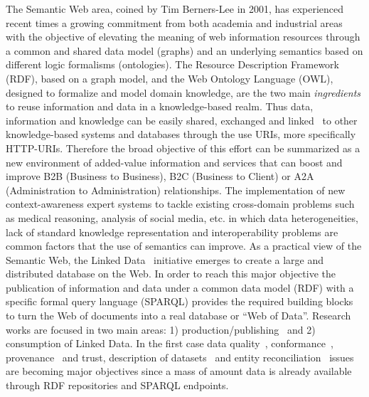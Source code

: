 The Semantic Web area, coined by Tim Berners-Lee in 2001, has experienced recent times a growing 
commitment from both academia and industrial areas  with the objective of elevating the meaning of web 
information resources through a common and shared data model (graphs) and an underlying semantics based 
on different logic formalisms (ontologies). The Resource Description Framework (RDF), based on a graph model, and the Web Ontology Language (OWL), 
designed to formalize and model domain knowledge, are the two main \textit{ingredients} to reuse information and data 
in a knowledge-based realm. Thus data, information and knowledge can be easily shared, exchanged and linked~\cite{Maali_Cyganiak_2011} 
to other knowledge-based systems and databases through the use URIs, more specifically HTTP-URIs. Therefore the broad objective of this effort can be summarized 
as a new environment of added-value information and services that can boost and improve B2B (Business to Business), B2C (Business to Client) or 
A2A (Administration to Administration) relationships. The implementation of new context-awareness expert systems to tackle existing 
cross-domain problems such as medical reasoning, analysis of social media, etc. in which data heterogeneities, 
lack of standard knowledge representation and interoperability problems are common factors that the use of semantics can improve. As a practical view of the Semantic Web, 
the Linked Data~\cite{Heath_Bizer_2011} initiative emerges to create a large and distributed database on the Web. 
In order to reach this major objective the publication of information and data under a common data model (RDF) 
with a specific formal query language (SPARQL) provides the required building blocks to turn the Web of documents 
into a real database or ``Web of Data''. Research works are focused in two main areas: 1) production/publishing~\cite{bizer07how} and 2) consumption of 
Linked Data. In the first case data quality~\cite{Bizer2009QA}, conformance~\cite{DBLP:journals/ws/HoganUHCPD12}, 
provenance~\cite{w3c-prov} and trust, description of datasets~\cite{void} and entity reconciliation~\cite{Maali_Cyganiak_2011} issues are becoming major objectives since a mass of amount data is already available through RDF repositories and SPARQL endpoints. 

